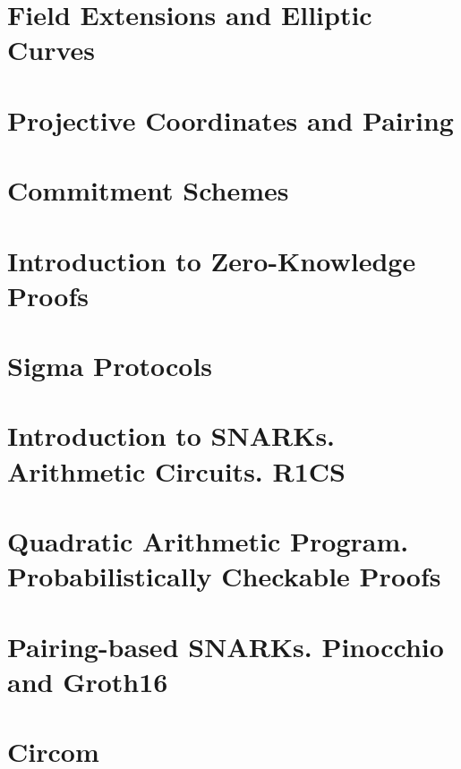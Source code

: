 \documentclass{zkdl-template}
\begin{document}


\section{Field Extensions and Elliptic Curves}

\label{section:field_extensions}

\section{Projective Coordinates and Pairing}



\section{Commitment Schemes}



\section{Introduction to Zero-Knowledge Proofs}



\section{Sigma Protocols}



\section{Introduction to SNARKs. Arithmetic Circuits. R1CS}

\label{section:circuits}

\section{Quadratic Arithmetic Program. Probabilistically Checkable Proofs}



\section{Pairing-based SNARKs. Pinocchio and Groth16}



\section{Circom}


\end{document}
